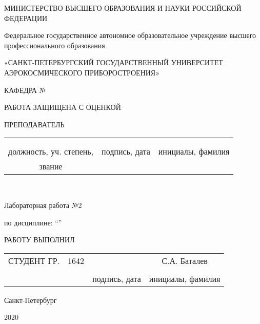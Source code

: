 \begin{titlepage}
	\begin{center}
		МИНИСТЕРСТВО ВЫСШЕГО ОБРАЗОВАНИЯ И НАУКИ РОССИЙСКОЙ ФЕДЕРАЦИИ

		Федеральное государственное автономное образовательное учреждение высшего профессионального образования

		«САНКТ-ПЕТЕРБУРГСКИЙ ГОСУДАРСТВЕННЫЙ УНИВЕРСИТЕТ АЭРОКОСМИЧЕСКОГО ПРИБОРОСТРОЕНИЯ»
		\vspace{1.5em}

		КАФЕДРА №\caf
		\vspace{4em}
	\end{center}

	РАБОТА ЗАЩИЩЕНА С ОЦЕНКОЙ
	\vspace{0.5em}

	ПРЕПОДАВАТЕЛЬ
	\vspace{1em}

	\normalsize{
		\begin{tabular}{ccc}
			\prepodz                 &                          & \prepod                  \\ [-1ex]
			\underline{\hspace{5cm}} & \underline{\hspace{5cm}} & \underline{\hspace{5cm}} \\
			должность, уч. степень,  & подпись, дата            & инициалы, фамилия        \\
			звание                   &                          &                          \\
		\end{tabular}
	}\\
	\vspace{6em}
	\begin{center}
		Лабораторная работа №2
		\vspace{1em}

		\labname
		\vspace{1em}

		по дисциплине: “\labdist”
	\end{center}

	\vspace{9em}
	РАБОТУ ВЫПОЛНИЛ
	\vspace{1em}

	\normalsize
	\begin{tabular}{cccc}
		СТУДЕНТ ГР. & 1642                     &                          & С.А. Баталев             \\ [-1ex]
		            & \underline{\hspace{3cm}} & \underline{\hspace{4cm}} & \underline{\hspace{5cm}} \\
		            &                          & подпись, дата            & инициалы, фамилия
	\end{tabular}
	\vfill
	\begin{center}
		Санкт-Петербург

		2020
	\end{center}
\end{titlepage}
